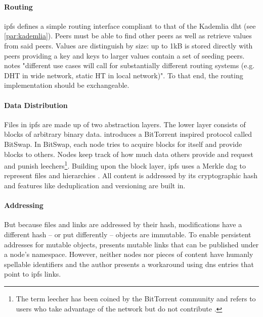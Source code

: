 \paragraph{Routing}
\gls{ipfs} defines a simple routing interface compliant to that of the Kademlia \gls{dht} (see \vref{par:kademlia}). Peers must be able to find other peers as well as retrieve values from said peers. Values are distinguish by size: up to 1kB is stored directly with peers providing a key and keys to larger values contain a set of seeding peers. \citet[\S3.5]{ipfs-whitepaper} notes "different use cases will call for substantially different routing systems (e.g. DHT in wide network, static HT in local network)". To that end, the routing implementation should be exchangeable.

\paragraph{Data Distribution}
Files in \gls{ipfs} are made up of two abstraction layers. The lower layer consists of blocks of arbitrary binary data. \citet[\S3.4]{ipfs-whitepaper} introduces a BitTorrent inspired protocol called BitSwap. In BitSwap, each node tries to acquire blocks for itself and provide blocks to others. Nodes keep track of how much data others provide and request and punish leechers\footnote{The term leecher has been coined by the BitTorrent community and refers to users who take advantage of the network but do not contribute \cite[\S7.5]{tanenbaum_wetherall_2011}.}. Building upon the block layer, \gls{ipfs} uses a Merkle \gls{dag} to represent files and hierarchies \cite[\S3.5]{ipfs-whitepaper}. All content is addressed by its cryptographic hash \cite{content-centric-networking} and features like deduplication and versioning are built in.

\paragraph{Addressing}
But because files and links are addressed by their hash, modifications have a different hash – or put differently – objects are immutable. To enable persistent addresses for mutable objects, \citet[\S3.7]{ipfs-whitepaper} presents mutable links that can be published under a node's namespace. However, neither nodes nor pieces of content have humanly spellable identifiers and the author presents a workaround using \gls{dns} entries that point to \gls{ipfs} links.
